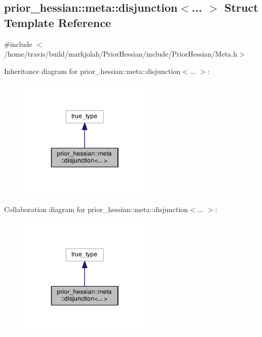 \hypertarget{structprior__hessian_1_1meta_1_1disjunction}{}\subsection{prior\+\_\+hessian\+:\+:meta\+:\+:disjunction$<$... $>$ Struct Template Reference}
\label{structprior__hessian_1_1meta_1_1disjunction}


{\ttfamily \#include $<$/home/travis/build/markjolah/\+Prior\+Hessian/include/\+Prior\+Hessian/\+Meta.\+h$>$}



Inheritance diagram for prior\+\_\+hessian\+:\+:meta\+:\+:disjunction$<$... $>$\+:\nopagebreak
\begin{figure}[H]
\begin{center}
\leavevmode
\includegraphics[width=178pt]{structprior__hessian_1_1meta_1_1disjunction__inherit__graph}
\end{center}
\end{figure}


Collaboration diagram for prior\+\_\+hessian\+:\+:meta\+:\+:disjunction$<$... $>$\+:\nopagebreak
\begin{figure}[H]
\begin{center}
\leavevmode
\includegraphics[width=178pt]{structprior__hessian_1_1meta_1_1disjunction__coll__graph}
\end{center}
\end{figure}



